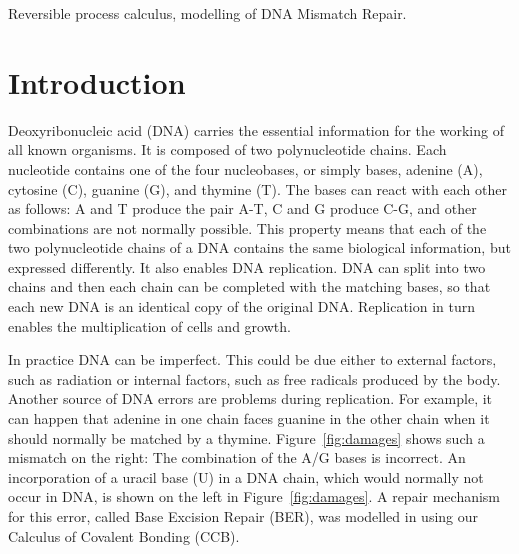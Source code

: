 \documentclass[review]{elsarticle}
\begin{document}
\begin{frontmatter}
\begin{keyword}Reversible process calculus, modelling of DNA Mismatch Repair.
\end{keyword}

\end{frontmatter}

\linenumbers

\section{Introduction}

Deoxyribonucleic acid (DNA) carries the essential information for the working of all known organisms. It is composed of two polynucleotide chains. Each nucleotide contains one of the four nucleobases, or simply bases,  adenine (A), cytosine (C), guanine (G), and thymine (T). 
The bases can react with each other as follows: A and T produce the pair A-T, C and G produce C-G,
and other combinations are not normally possible. This property means that each of the two polynucleotide chains of a DNA contains the same biological information, but expressed differently. It also enables DNA replication. 
DNA can split into two chains and then each chain can be completed with the matching bases, so that each new DNA is an identical copy of the original DNA. Replication in turn enables the multiplication of cells and growth.

In practice DNA can be imperfect. This could be due either to external factors, such as radiation 
or internal factors, such as free radicals produced by the body. Another source of DNA errors are problems during replication. For example, it can happen that adenine in one chain faces guanine in the other chain when it should normally be matched by a thymine. Figure~\ref{fig:damages} shows such a mismatch on the right: The combination of the A/G bases is incorrect. An incorporation of a uracil base (U) in a DNA chain, which would normally not occur in DNA, is shown on the left in Figure~\ref{fig:damages}. A repair mechanism for this error, called Base Excision Repair (BER), was modelled in \cite{10.1007/978-3-319-99498-7_8} using our Calculus of Covalent Bonding (CCB).
\end{document}
